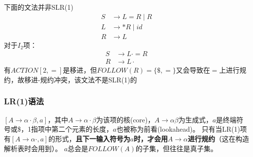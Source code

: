 \begin{example}
下面的文法并非SLR(1)
\[\begin{aligned}
S &\to L=R\mid R\\
L &\to *R\mid id\\
R &\to L
\end{aligned}\]
对于$I_2$项：
\[\begin{aligned}
S &\to L\cdot=R\\
R &\to L\cdot
\end{aligned}\]
有$ACTION[2,=]$是移进，但$FOLLOW(R)=\{\$,=\}$又会导致在$=$上进行规约，故移进-规约冲突，该文法不是SLR(1)的
\end{example}

\subsubsection{LR(1)语法}
\begin{definition}[LR(1)项]
$[A\to\alpha\cdot\beta,a]$，其中$A\to\alpha\cdot\beta$为该项的核(core)，$A\to\alpha\beta$为生成式，$a$是终端符号或\$，1指项中第二个元素的长度，$a$也被称为前看(lookahead)。
只有当LR(1)项有$[A\to\alpha\cdot,a]$的形式，\textbf{且下一输入符号为$a$时，才会用$A\to\alpha$进行规约}（这在构造解析表时会用到）。
$a$总会是$FOLLOW(A)$的子集，但往往是真子集。
\end{definition}

